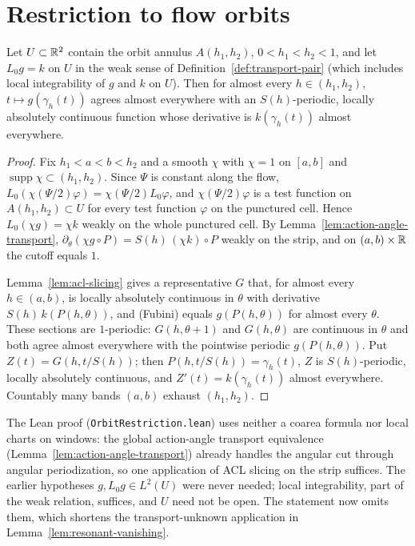 \section{Restriction to flow orbits}

\begin{lemma}
\label{lem:coarea}
\leanok
Let $U\subset\mathbb{R}^2$ contain the orbit annulus $A(h_1,h_2)$, $0<h_1<h_2<1$, and let
$L_0g=k$ on $U$ in the weak sense of Definition~\ref{def:transport-pair} (which includes local
integrability of $g$ and $k$ on $U$). Then for almost every $h\in(h_1,h_2)$,
$t\mapsto g(\gamma_h(t))$ agrees almost everywhere with an $S(h)$-periodic, locally
absolutely continuous function whose derivative is $k(\gamma_h(t))$ almost everywhere.
\end{lemma}

\begin{proof}
\leanok
Fix $h_1<a<b<h_2$ and a smooth $\chi$ with $\chi=1$ on $[a,b]$ and
$\operatorname{supp}\chi\subset(h_1,h_2)$. Since $\Psi$ is constant along the flow,
$L_0(\chi(\Psi/2)\varphi)=\chi(\Psi/2)L_0\varphi$, and $\chi(\Psi/2)\varphi$ is a test function
on $A(h_1,h_2)\subset U$ for every test function $\varphi$ on the punctured cell. Hence
$L_0(\chi g)=\chi k$ weakly on the whole punctured cell. By
Lemma~\ref{lem:action-angle-transport}, $\partial_\theta(\chi g\circ P)=S(h)\,(\chi k)\circ P$
weakly on the strip, and on $(a,b)\times\mathbb{R}$ the cutoff equals $1$.

Lemma~\ref{lem:acl-slicing} gives a representative $G$ that, for almost every
$h\in(a,b)$, is locally absolutely continuous in $\theta$ with derivative
$S(h)\,k(P(h,\theta))$, and (Fubini) equals $g(P(h,\theta))$ for almost every $\theta$.
These sections are $1$-periodic: $G(h,\theta+1)$ and $G(h,\theta)$ are continuous in $\theta$ and both
agree almost everywhere with the pointwise periodic $g(P(h,\theta))$. Put
$Z(t)=G(h,t/S(h))$; then $P(h,t/S(h))=\gamma_h(t)$, $Z$ is $S(h)$-periodic, locally absolutely
continuous, and $Z'(t)=k(\gamma_h(t))$ almost everywhere. Countably many bands $(a,b)$ exhaust
$(h_1,h_2)$.
\end{proof}

\begin{remark}
The Lean proof (\texttt{OrbitRestriction.lean}) uses neither a coarea formula nor local
charts on windows: the global action-angle transport equivalence
(Lemma~\ref{lem:action-angle-transport}) already handles the angular cut through angular
periodization, so one application of ACL slicing on the strip suffices. The earlier
hypotheses $g,L_0g\in L^2(U)$ were never needed; local integrability, part of the weak
relation, suffices, and $U$ need not be open. The statement now omits them, which shortens
the transport-unknown application in Lemma~\ref{lem:resonant-vanishing}.
\end{remark}

